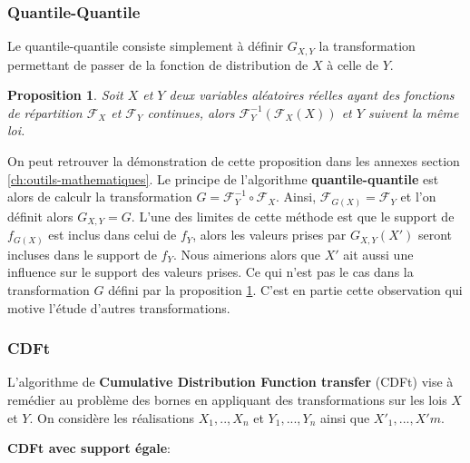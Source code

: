 \documentclass[a4paper,11pt]{article}
\numberwithin{equation}{section}
\newtheorem{proposition}{Proposition}
\begin{document}
\subsubsection{Quantile-Quantile}
\label{Q-Q}
Le quantile-quantile consiste simplement à définir $G_{X,Y}$ la transformation permettant de passer de la fonction de distribution de $X$ à celle de $Y$. 
\begin{proposition}
	\label{prop:QQ_formula}
	Soit $X$ et $Y$ deux variables aléatoires réelles ayant des fonctions de répartition $\mathcal{F}_{X}$ et $\mathcal{F}_{Y}$ continues, alors 
	$\mathcal{F}^{-1}_Y (\mathcal{F}_X(X))$ et $Y$ suivent la même loi. 
\end{proposition}
On peut retrouver la démonstration de cette proposition dans les annexes section \ref{ch:outils-mathematiques}. Le principe de l'algorithme \textbf{quantile-quantile} est alors de calculr la transformation $G=\mathcal{F}^{-1}_{Y} \circ \mathcal{F}_{X}$. Ainsi, $\mathcal{F}_{G(X)}=\mathcal{F}_{Y}$ et l'on définit alors $G_{X,Y}=G$. L'une des limites de cette méthode est que le support de $f_{G(X)}$ est inclus dans celui de $f_{Y}$, alors les valeurs prises par $G_{X,Y}(X')$ seront incluses dans le support de $f_Y$. Nous aimerions alors que $X'$ ait aussi une influence sur le support des valeurs prises. Ce qui n'est pas le cas dans la transformation $G$ défini par la proposition \ref{prop:QQ_formula}. C'est en partie cette observation qui motive l'étude d'autres transformations. 

\subsubsection{CDFt}
\label{CDf-t-algo}

L'algorithme de \textbf{Cumulative Distribution Function transfer} (CDFt) vise à remédier au problème des bornes en appliquant des transformations sur les lois $X$ et $Y$. On considère les réalisations $X_1,..,X_n$ et $Y_1,...,Y_n$ ainsi que $X'_{1},...,X'{m}$.

\vspace{0.7cm}

\noindent \textbf{CDFt avec support égale}:
\end{document}
